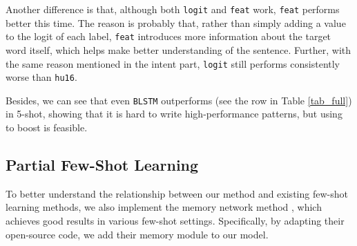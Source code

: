 Another difference is that, although both \texttt{logit} and \texttt{feat} work, \texttt{feat} performs better this time. The reason is probably that, rather than simply adding a value to the logit of each label, \texttt{feat} introduces more information about the target word itself, which helps \NN make better understanding of the sentence. Further, with the same reason mentioned in the intent part, \texttt{logit} still performs consistently worse than \texttt{hu16}.


Besides, we can see that even \texttt{BLSTM} outperforms \RE (see the \RE row in Table \ref{tab_full}) in 5-shot, showing that it is hard to write high-performance \RE patterns, but using \RE to boost \NN is feasible. 


\subsection{Partial Few-Shot Learning}
To better understand the relationship between our method and existing few-shot learning methods, we also implement the memory network method \cite{kaiser2017learning}, which achieves good results in various few-shot settings. Specifically, by adapting their open-source code, we add their memory module to our \BLSTM model.

